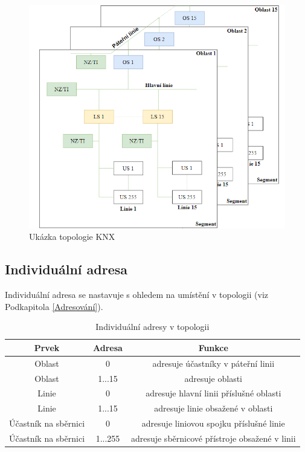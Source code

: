 \begin{figure}[!h]
  \begin{center}
    \includegraphics[scale=0.55]{obrazky/Ukazka topologie.png}
  \end{center}
  \caption[Ukázka topologie KNX\cite{Topologie}]{Ukázka topologie KNX\cite{Topologie}}
  \label{fig:Ukázka topologie KNX}
\end{figure}

\subsection{Individuální adresa}
Individuální adresa se nastavuje s ohledem na umístění v topologii (viz Podkapitola \ref{Adresování}).
\begin{table}[h]
 \caption[Individuální adresy v topologii \cite{Topologie}]{Individuální adresy v topologii \cite{Topologie}}
   \small
    \centering
	  \begin{tabular}{|c|c|c|}
	    \hline
	    Prvek & Adresa & Funkce  \\
	    \hline\hline
	    Oblast & 0 & adresuje účastníky v páteřní linii \\
	    \hline
	    Oblast & 1...15 & adresuje oblasti \\
	    \hline
	    Linie & 0 & adresuje hlavní linii příslušné oblasti \\
	    \hline
	    Linie & 1...15 & adresuje linie obsažené v oblasti\\ 
	    \hline
	    Účastník na sběrnici & 0 & adresuje liniovou spojku příslušné linie \\
	    \hline
	    Účastník na sběrnici & 1...255 & adresuje sběrnicové přístroje obsažené v linii \\
	    \hline
	  \end{tabular}
\end{table}
